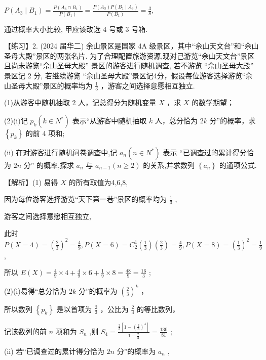 \documentclass[10pt]{article}
\begin{document}
\(P\left( {{A}_{3} \mid  {B}_{1}}\right)  = \frac{P\left( {{A}_{3} \cap  {B}_{1}}\right) }{P\left( {B}_{1}\right) } = \frac{P\left( {A}_{3}\right) P\left( {{B}_{1} \mid  {A}_{3}}\right) }{P\left( {B}_{1}\right) } = \frac{3}{8},\)

通过概率大小比较, 甲应该改选 4 号或 3 号箱.

【练习】2. (2024 届华二) 余山景区是国家 4A 级景区，其中“佘山天文台”和“佘山圣母大殿”景区的两张名片. 为了合理配置旅游资源,现对己游览“佘山天文台”景区且尚未游览“佘山圣母大殿” 景区的游客进行随机调查, 若不游览 “佘山圣母大殿” 景区记 2 分, 若继续游览 “佘山圣母大殿”景区记4分，假设每位游客选择游览“佘山圣母大殿”景区的概率均为 \(\frac{1}{3}\) ，游客之间选择意愿相互独立.

(1)从游客中随机抽取 2 人，记总得分为随机变量 \(X\) ，求 \(X\) 的数学期望；

(2)(i)记 \({p}_{k}\left( {k \in  {N}^{ * }}\right)\) 表示“从游客中随机抽取 \(k\) 人，总分恰为 \({2k}\) 分”的概率，求 \(\left\{  {p}_{k}\right\}\) 的前 4 项和;

(ii) 在对游客进行随机问卷调查中,记 \({a}_{n}\left( {n \in  {N}^{ * }}\right)\) 表示 “已调查过的累计得分恰为 \({2n}\) 分” 的概率,探求 \({a}_{n}\) 与 \({a}_{n - 1}\left( {n \geq  2}\right)\) 的关系,并求数列 \(\left\{  {a}_{n}\right\}\) 的通项公式.

【解析】(1) 易得 \(X\) 的所有取值为4,6,8,

因为每位游客选择游览“天下第一巷”景区的概率均为 \(\frac{1}{3}\) ,

游客之间选择意愿相互独立,

此时 \(P\left( {X = 4}\right)  = {\left( \frac{2}{3}\right) }^{2} = \frac{4}{9},P\left( {X = 6}\right)  = {C}_{2}^{1}\left( \frac{1}{3}\right) \left( \frac{2}{3}\right)  = \frac{4}{9},P\left( {X = 8}\right)  = {\left( \frac{1}{3}\right) }^{2} = \frac{1}{9}\) ,

所以 \(E\left( X\right)  = \frac{4}{9} \times  4 + \frac{4}{9} \times  6 + \frac{1}{9} \times  8 = \frac{48}{9} = \frac{16}{3}\) ;

(2)(i)易得“总分恰为 \({2k}\) 分”的概率为 \({\left( \frac{2}{3}\right) }^{k}\) ，

所以数列 \(\left\{  {p}_{k}\right\}\) 是以首项为 \(\frac{2}{3}\) ，公比为 \(\frac{2}{3}\) 的等比数列，

记该数列的前 \(n\) 项和为 \({S}_{n}\) ,则 \({S}_{4} = \frac{\frac{2}{3}\left\lbrack  {1 - {\left( \frac{2}{3}\right) }^{4}}\right\rbrack  }{1 - \frac{2}{3}} = \frac{130}{81}\) ;

(ii) 若“已调查过的累计得分恰为 \({2n}\) 分”的概率为 \({a}_{n}\) ,
\end{document}
